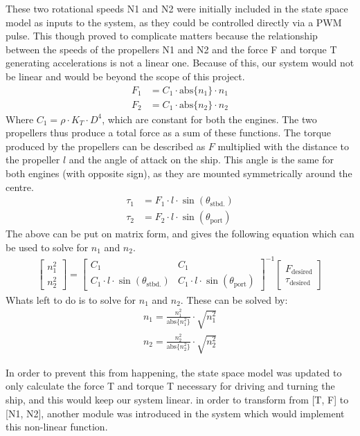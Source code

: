 These two rotational speeds N1 and N2 were initially included in the state space model as inputs to the system, as they could be controlled directly via a PWM pulse. This though proved to complicate matters because the relationship between the speeds of the propellers N1 and N2 and the force F and torque T generating accelerations is not a linear one. Because of this, our system would not be linear and would be beyond the scope of this project. 
\begin{align}
F_1 &= C_1 \cdot \text{abs}\{n_1\} \cdot n_1\\
F_2 &= C_1 \cdot \text{abs}\{n_2\} \cdot n_2
\end{align}
Where $C_1 = \rho \cdot K_T \cdot D^4$, which are constant for both the engines. The two propellers thus produce a total force as a sum of these functions. The torque produced by the propellers can be described as $F$ multiplied with the distance to the propeller $l$ and the angle of attack on the ship. This angle is the same for both engines (with opposite sign), as they are mounted symmetrically around the centre.
\begin{align}
\tau_1 &= F_1 \cdot l \cdot \sin(\theta_\text{stbd.})\\
\tau_2 &= F_2 \cdot l \cdot \sin(\theta_\text{port})
\end{align}
The above can be put on matrix form, and gives the following equation which can be used to solve for $n_1$ and $n_2$.
\begin{align}
\begin{bmatrix}
n_1^2\\
n_2^2
\end{bmatrix} = \begin{bmatrix}
C_1 & C_1\\
C_1 \cdot l \cdot \sin(\theta_\text{stbd.}) & C_1 \cdot l \cdot \sin(\theta_\text{port})
\end{bmatrix}^{-1}\begin{bmatrix}
F_\text{desired}\\
\tau_\text{desired}
\end{bmatrix}\label{eq:solver}
\end{align}
Whats left to do is to solve for $n_1$ and $n_2$. These can be solved by:
\begin{align}
n_1 = \frac{n_1^2}{\text{abs}\{n_1^2\}} \cdot \sqrt{n_1^2}\\
n_2 = \frac{n_2^2}{\text{abs}\{n_2^2\}} \cdot \sqrt{n_2^2}
\end{align}

In order to prevent this from happening, the state space model was updated to only calculate the force T and torque T necessary for driving and turning the ship, and this would keep our system linear. in order to transform from [T, F] to [N1, N2], another module was introduced in the system which would implement this non-linear function. 

